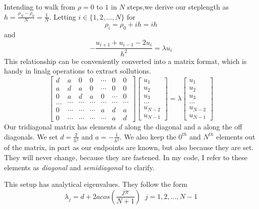 \documentclass[10pt, twocolumn]{article}
\begin{document}
Intending to walk from $\rho = 0$ to $1$ in $N$ steps,we derive our steplength as 
$h = \frac{\rho_N - \rho_0}{N} = \frac{1}{N}$. Letting $i \in \{ 1, 2, \ldots, N\}$ for 
\[\rho_i = \rho_0 + ih = ih\] and
\[ -\frac{u_{i+1} + u_{i-1} - 2u_{i}}{h^2} = \lambda u_i\]
This relationship can be conveniently converted into a matrix format, which is handy in linalg 
operations to extract sollutions. 
\begin{equation}
    \begin{bmatrix} d& a & 0   & 0    & \cdots  &0     & 0 \\
                                a & d & a & 0    & \cdots  &0     &0 \\
                                0   & a & d & a  &0       &\cdots & 0\\
                                \dots  & \cdots & \cdots & \cdots  &\cdots      &\cdots & \cdots\\
                                0   & \cdots & \cdots & \cdots  &a  &d & a\\
                                0   & \cdots & \cdots & \cdots  &\cdots       &a & d\end{bmatrix} 
                                 \begin{bmatrix} u_1 \\ u_2 \\ u_3 \\ \dots \\ u_{N-2} \\ u_{N-1}\end{bmatrix} 
                                     = \lambda \begin{bmatrix} u_1 \\ u_2 \\ u_3 \\ \dots \\ u_{N-2} \\ u_{N-1}\end{bmatrix}
\label{eq:matrixse} 
\end{equation}
Our tridiagonal matrix has elements $d$ along the diagonal and a along the 
off diagonals. We set $d = \frac{2}{h^2}$ and $a = -\frac{1}{h^2}$. We also keep the $0^{th}$ 
and $N^{th}$ elements out of the matrix, in part as our endpoints are known, but also because 
they are set. They will never change, because they are fastened. In my code, I refer to these 
elements as \textit{diagonal} and \textit{semidiagonal} to clarify. 

This setup has analytical eigenvalues. They follow the form
\[ \lambda_j = d + 2acos(\frac{j\pi}{N+1}) \;\; j = 1, 2, \ldots, N-1 \]\\
\end{document}
